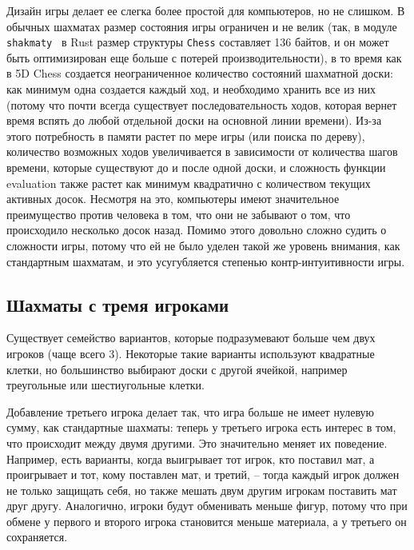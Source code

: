\documentclass{article}
\begin{document}
Дизайн игры делает ее слегка более простой для компьютеров, но не слишком.
В обычных шахматах размер состояния игры ограничен и не велик
(так, в модуле \texttt{shakmaty}~\cite{shakmaty-crate} в Rust размер структуры \texttt{Chess} составляет 136 байтов,
и он может быть оптимизирован еще больше с потерей производительности),
в то время как в 5D Chess создается неограниченное количество состояний шахматной доски:
как минимум одна создается каждый ход,
и необходимо хранить все из них
(потому что почти всегда существует последовательность ходов,
которая вернет время вспять до любой отдельной доски на основной линии времени).
Из-за этого потребность в памяти растет по мере игры (или поиска по дереву),
количество возможных ходов увеличивается в зависимости от количества шагов времени, которые существуют до и после одной доски,
и сложность функции evaluation также растет как минимум квадратично с количеством текущих активных досок.
Несмотря на это, компьютеры имеют значительное преимущество против человека в том,
что они не забывают о том, что происходило несколько досок назад.
Помимо этого довольно сложно судить о сложности игры,
потому что ей не было уделен такой же уровень внимания, как стандартным шахматам,
и это усугубляется степенью контр-интуитивности игры. 

\subsection{Шахматы с тремя игроками}

Существует семейство вариантов,
которые подразумевают больше чем двух игроков
(чаще всего 3).
Некоторые такие варианты используют квадратные клетки,
но большинство выбирают доски с другой ячейкой,
например треугольные или шестиугольные клетки.

Добавление третьего игрока делает так, что игра больше не имеет нулевую сумму,
как стандартные шахматы:
теперь у третьего игрока есть интерес в том, что происходит между двумя другими.
Это значительно меняет их поведение.
Например, есть варианты, когда выигрывает тот игрок, кто поставил мат,
а проигрывает и тот, кому поставлен мат, и третий, -- 
тогда каждый игрок должен не только защищать себя, но также мешать двум другим игрокам поставить мат друг другу.
Аналогично, игроки будут обменивать меньше фигур,
потому что при обмене у первого и второго игрока становится меньше материала,
а у третьего он сохраняется.
\end{document}
